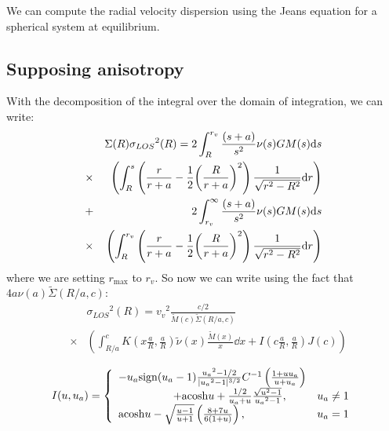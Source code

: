 We can compute the radial velocity dispersion using the Jeans equation for a
spherical system at equilibrium.

\subsection{Supposing \citet{Mamon+05} anisotropy}

With the decomposition of the integral over the domain of integration, we can
write:
%
\begin{eqnarray}
    &&\Sigma{(R)}{\sigma_{LOS}}^2{(R)}=
        2\int_R^{r_v}{\frac{\left({s+a}\right)}{s^2}{\nu(s)}{G}{M(s)}}{{\rm{d}}{s}}
        \nonumber\\
    &\times&
        \left(\int_R^s{\left(\frac{r}{r+a}-\frac{1}{2}
        {\left(\frac{R}{r+a}\right)}^2\right)
        \frac{1}{\sqrt{r^2-R^2}}{\rm{d}}{r}}\right)\nonumber\\
    &+&2\int_{r_v}^{\infty}
        \frac{\left({s+a}\right)}{s^2}\nu(s){G}{M(s)}{\rm{d}}{s}\nonumber\\
    &\times&
        \left(\int_R^{r_v}
            \left(\frac{r}{r+a}-\frac{1}{2}{\left(\frac{R}{r+a}\right)}^2\right)
            \frac{1}{\sqrt{r^2-R^2}}{\rm{d}}{r}\right)\nonumber\\
\end{eqnarray}
%
where we are setting $r_{\max}$ to $r_v$. So now we can write using the
fact that $4a\nu(a)\widetilde{\Sigma}(R/a,c)$:
%
\begin{eqnarray}
    &&{\sigma_{LOS}}^2{(R)}={v_v}^2\frac{c/2}{\widetilde{M}{(c)}\widetilde{\Sigma}{(R/a,c)}}\nonumber\\
    &\times&\left(\int_{R/a}^c{{K}\left({x\frac{a}{R},\frac{a}{R}}\right)}\widetilde{\nu}{(x)}
    \frac{\widetilde{M}{(x)}}{x}\dd{x}+I\left({c\frac{a}{R},\frac{a}{R}}\right){J(c)}\right)\nonumber\\
\end{eqnarray}
%
\begin{equation}
    I(u,u_a)=\left\{\begin{array}{lr}
        -u_a{\rm{sign}}(u_a-1)\frac{{u_a}^2-1/2}{|{u_a}^2-1|^{3/2}}{C^{-1}\left(\frac{1+u{u_a}}{u+u_a}\right)}&\\
        \hspace{5em}+{\rm{acosh}}{u}+\frac{1/2}{u_a+u}\frac{\sqrt{u^2-1}}{{u_a}^2-1},&{u_a}\neq1\\
        {\rm{acosh}}{u}-\sqrt{\frac{u-1}{u+1}}\left(\frac{8+7u}{6(1+u)}\right),&{u_a}=1\\
    \end{array}\right.
\end{equation}
